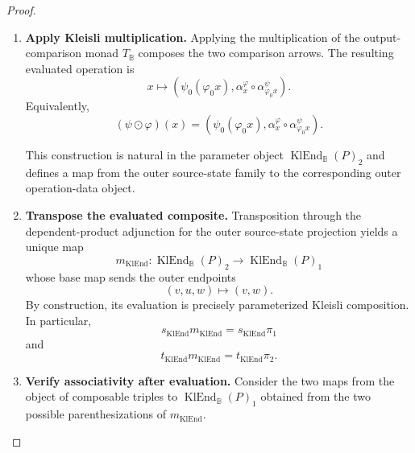 \begin{proof}
\begin{enumerate}
        Thus the two evaluations produce the composable comparison chain
        \[
        \begin{tikzcd}[column sep=large]
            q(\psi_0(\varphi_0x))
                \arrow[r, "\alpha^\psi_{\varphi_0x}"]
            &
            q(\varphi_0x)
                \arrow[r, "\alpha^\varphi_x"]
            &
            q(x).
        \end{tikzcd}
        \]

        \item \textbf{Apply Kleisli multiplication.}
        Applying the multiplication of the output-comparison monad
        \(T_{\mathbb B}\) composes the two comparison arrows. The resulting
        evaluated operation is
        \[
            x
            \longmapsto
            \left(
                \psi_0(\varphi_0x),
                \alpha^\varphi_x
                \circ
                \alpha^\psi_{\varphi_0x}
            \right).
        \]
        Equivalently,
        \[
            (\psi\odot\varphi)(x)
            =
            \left(
                \psi_0(\varphi_0x),
                \alpha^\varphi_x
                \circ
                \alpha^\psi_{\varphi_0x}
            \right).
        \]

        This construction is natural in the parameter object
        \(\operatorname{KlEnd}_{\mathbb B}(P)_2\) and defines a map from the
        outer source-state family to the corresponding outer operation-data
        object.

        \item \textbf{Transpose the evaluated composite.}
        Transposition through the dependent-product adjunction for the outer
        source-state projection yields a unique map
        \[
            m_{\operatorname{KlEnd}}:
            \operatorname{KlEnd}_{\mathbb B}(P)_2
            \to
            \operatorname{KlEnd}_{\mathbb B}(P)_1
        \]
        whose base map sends the outer endpoints
        \[
            (v,u,w)\longmapsto(v,w).
        \]
        By construction, its evaluation is precisely parameterized Kleisli
        composition. In particular,
        \[
            s_{\operatorname{KlEnd}}
            m_{\operatorname{KlEnd}}
            =
            s_{\operatorname{KlEnd}}\pi_1
        \]
        and
        \[
            t_{\operatorname{KlEnd}}
            m_{\operatorname{KlEnd}}
            =
            t_{\operatorname{KlEnd}}\pi_2.
        \]

        \item \textbf{Verify associativity after evaluation.}
        Consider the two maps from the object of composable triples to
        \(\operatorname{KlEnd}_{\mathbb B}(P)_1\) obtained from the two
        possible parenthesizations of \(m_{\operatorname{KlEnd}}\).


\end{enumerate}
\end{proof}
